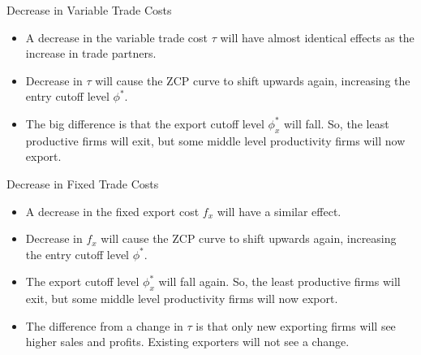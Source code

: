 \documentclass[aspectratio=169]{beamer}
\begin{document}
\begin{frame}{Decrease in Variable Trade Costs}

\begin{itemize}
    \item<1-> A decrease in the variable trade cost $ \tau $ will have almost identical effects as the increase in trade partners.
    \item<2-> Decrease in $ \tau $ will cause the ZCP curve to shift upwards again, increasing the entry cutoff level $ \phi^{*} $.
    \item<3-> The big difference is that the export cutoff level $ \phi_{x}^{*} $ will fall.  So, the least productive firms will exit, but some middle level productivity firms will now export.
\end{itemize}
    
\end{frame}


\begin{frame}{Decrease in Fixed Trade Costs}

\begin{itemize}
    \item<1-> A decrease in the fixed export cost $ f_{x} $ will have a similar effect.
    \item<2-> Decrease in $ f_{x} $ will cause the ZCP curve to shift upwards again, increasing the entry cutoff level $ \phi^{*} $.
    \item<3-> The export cutoff level $ \phi_{x}^{*} $ will fall again.  So, the least productive firms will exit, but some middle level productivity firms will now export.
    \item<4-> The difference from a change in $ \tau $ is that only new exporting firms will see higher sales and profits.  Existing exporters will not see a change.
\end{itemize}
    
\end{frame}

\end{document}
